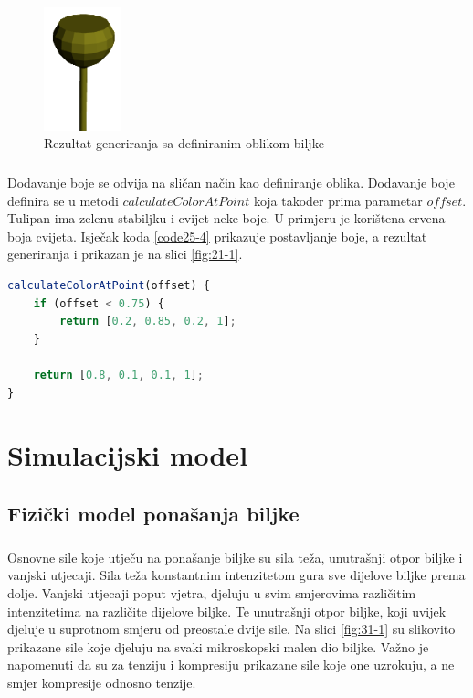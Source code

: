 \documentclass[times, utf8, diplomski]{fer}
\begin{document}
\begin{figure}[h]
	\centering
	\includegraphics[width=0.2\textwidth]{img/25-3}
	\caption{Rezultat generiranja sa definiranim oblikom biljke}
	\label{fig:25-3}
\end{figure}
\paragraph{}
Dodavanje boje se odvija na sličan način kao definiranje oblika. Dodavanje boje definira se 
u metodi $calculateColorAtPoint$ koja također prima parametar $offset$. Tulipan ima zelenu 
stabiljku i cvijet neke boje. U primjeru je korištena crvena boja cvijeta. Isječak koda 
\ref{code25-4} prikazuje postavljanje boje, a rezultat generiranja i prikazan je na slici 
\ref{fig:21-1}.

\begin{lstlisting}[language=Javascript,caption=Dodavanje boja modelu,label=code25-4]
calculateColorAtPoint(offset) {
	if (offset < 0.75) {
		return [0.2, 0.85, 0.2, 1];
	}

	return [0.8, 0.1, 0.1, 1];
}
\end{lstlisting}


\chapter{Simulacijski model}
\section{Fizički model ponašanja biljke}
\paragraph{}
Osnovne sile koje utječu na ponašanje biljke su sila teža, unutrašnji otpor 
biljke i vanjski utjecaji. Sila teža konstantnim intenzitetom gura sve dijelove 
biljke prema dolje. Vanjski utjecaji poput vjetra, djeluju u svim smjerovima 
različitim intenzitetima na različite dijelove biljke. Te unutrašnji otpor 
biljke, koji uvijek djeluje u suprotnom smjeru od preostale dvije sile. Na 
slici \ref{fig:31-1} su slikovito prikazane sile koje djeluju na svaki mikroskopski malen 
dio biljke. Važno je napomenuti da su za tenziju i kompresiju prikazane sile koje one 
uzrokuju, a ne smjer kompresije odnosno tenzije.
\end{document}
